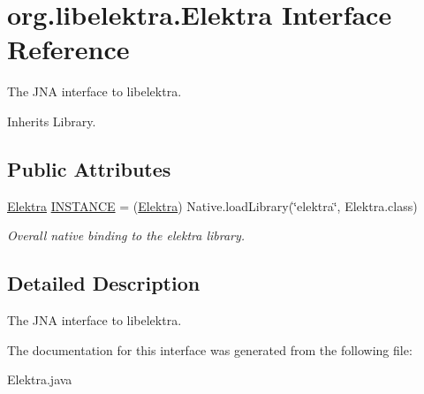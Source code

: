 \hypertarget{interfaceorg_1_1libelektra_1_1Elektra}{}\section{org.\+libelektra.\+Elektra Interface Reference}
\label{interfaceorg_1_1libelektra_1_1Elektra}


The J\+NA interface to libelektra.  




Inherits Library.

\subsection*{Public Attributes}
\begin{DoxyCompactItemize}
\item 
\mbox{\label{interfaceorg_1_1libelektra_1_1Elektra_a5a69a68a26ccec272c0f992f0a94a4cc}} 
\hyperlink{interfaceorg_1_1libelektra_1_1Elektra}{Elektra} \hyperlink{interfaceorg_1_1libelektra_1_1Elektra_a5a69a68a26ccec272c0f992f0a94a4cc}{I\+N\+S\+T\+A\+N\+CE} = (\hyperlink{interfaceorg_1_1libelektra_1_1Elektra}{Elektra}) Native.\+load\+Library(\char`\"{}elektra\char`\"{}, Elektra.\+class)
\begin{DoxyCompactList}\small\item\em Overall native binding to the elektra library. \end{DoxyCompactList}\end{DoxyCompactItemize}


\subsection{Detailed Description}
The J\+NA interface to libelektra. 

The documentation for this interface was generated from the following file\+:\begin{DoxyCompactItemize}
\item 
Elektra.\+java\end{DoxyCompactItemize}
